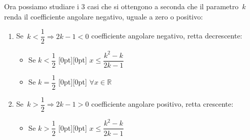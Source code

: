        {}
       {}

Ora possiamo studiare i 3 casi che si ottengono a seconda che il 
parametro~\(k\) renda il coefficiente angolare negativo, uguale a zero 
o positivo:

\begin{enumerate}
 \item Se~\(k < \dfrac{1}{2} \Rightarrow 2 k - 1 < 0\)
 coefficiente angolare negativo, retta decrescente:

       {}
       {}

\vspace{-2em}
\begin{itemize} [nosep]
 \item 
Se \quad \(k < \dfrac{1}{2}\) \qquad 
\raisebox{-9pt}[0pt][0pt]{
}
\qquad \(x \le \dfrac{k^2 - k}{2 k - 1}\)
\end{itemize}

       {\segnineg}
       {}

\vspace{-2em}
\begin{itemize} [nosep]
 \item 
Se \quad \(k = \dfrac{1}{2}\) \qquad 
\raisebox{-20pt}[0pt][0pt]{
}
\qquad \(\forall x \in \mathbb{R}\)
\end{itemize}

 \item Se~\(k > \dfrac{1}{2} \Rightarrow 2 k - 1 > 0\)
 coefficiente angolare positivo, retta crescente:

       {}
       {}

\vspace{-2em}
\begin{itemize} [nosep]
 \item 
Se \quad \(k > \dfrac{1}{2}\) \qquad 
\raisebox{-9pt}[0pt][0pt]{
}
\qquad \(x \le \dfrac{k^2 - k}{2 k - 1}\)
\end{itemize}

\end{enumerate}

% 


